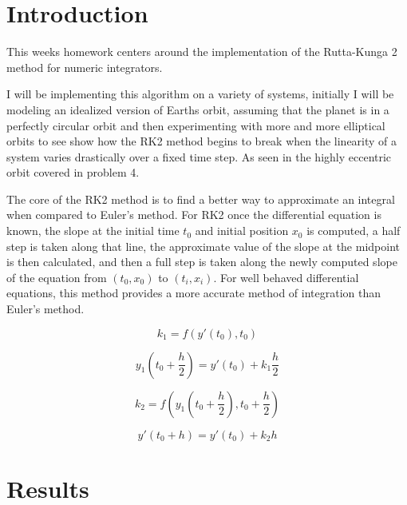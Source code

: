 \documentclass{article}
\author{\hwauthor}
\title{\hwtitle}
\date{\hwdate}
\begin{document}
\maketitle
\thispagestyle{fancy}

\section{Introduction}
 
This weeks homework centers around the implementation of the Rutta-Kunga 2 method for numeric integrators.

I will be implementing this algorithm on a variety of systems, initially I will be modeling an idealized version of Earths orbit, assuming that the planet is in a perfectly circular orbit and then experimenting with more and more elliptical orbits to see show how the RK2 method begins to break when the linearity of a system varies drastically over a fixed time step. As seen in the highly eccentric orbit covered in problem 4. 

The core of the RK2 method is to find a better way to approximate an integral when compared to Euler's method. For RK2 once the differential equation is known, the slope at the initial time $t_0$ and initial position $x_0$ is computed, a half step is taken along that line, the approximate value of the slope at the midpoint is then calculated, and then a full step is taken along the newly computed slope of the equation from $(t_0, x_0)$ to $(t_i, x_i)$. For well behaved differential equations, this method provides a more accurate method of integration than Euler's method.

\begin{equation}
	k_1 = f(y'(t_0),t_0)
\end{equation}

\begin{equation}
	y_1(t_0 + \frac{h}{2}) = y'(t_0) + k_1\frac{h}{2}
\end{equation}

\begin{equation}
	k_2 = f(y_1(t_0+\frac{h}{2}), t_0 +\frac{h}{2})
\end{equation}

\begin{equation}\label{eq:rk2}
	y'(t_0+h) = y'(t_0)+k_2h 
\end{equation}

\section{Results}
\end{document}

